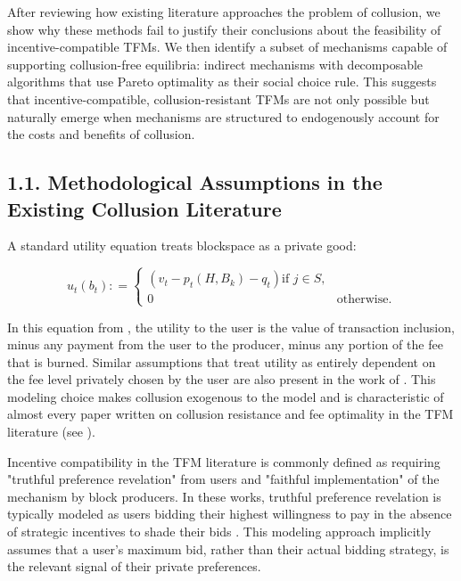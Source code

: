 \documentclass[oneside]{article}   	%
\begin{document}
After reviewing how existing literature approaches the problem of collusion, we show why these methods fail to justify their conclusions about the feasibility of incentive-compatible TFMs. We then identify a subset of mechanisms capable of supporting collusion-free equilibria: indirect mechanisms with decomposable algorithms that use Pareto optimality as their social choice rule. This suggests that incentive-compatible, collusion-resistant TFMs are not only possible but naturally emerge when mechanisms are structured to endogenously account for the costs and benefits of collusion.

\subsection*{1.1. Methodological Assumptions in the Existing Collusion Literature}

A standard utility equation treats blockspace as a private good:

\[
u_t\left(b_t\right) : =
\begin{cases}
\left(
        v_t - p_t\left(H,B_k\right) - q_t
\right) \text{if } j \in S, \\ 0 & \text{otherwise.}
\end{cases}
\]

In this equation from \cite{roughgarden2024}, the utility to the user is the value of transaction inclusion, minus any payment from the user to the producer, minus any portion of the fee that is burned. Similar assumptions that treat utility as entirely dependent on the fee level privately chosen by the user are also present in the work of \cite{chung2023foundations}. This modeling choice makes collusion exogenous to the model and is characteristic of almost every paper written on collusion resistance and fee optimality in the TFM literature (see \cite{chen2022bayesian, ferreira2021dynamic, wu2023maximizing, damle2024designing, gafni2024barriers, bahrani2023transaction, bahrani2024transaction, chung2024collusion}).

Incentive compatibility in the TFM literature is commonly defined as requiring "truthful preference revelation" from users and "faithful implementation" of the mechanism by block producers. In these works, truthful preference revelation is typically modeled as users bidding their highest willingness to pay in the absence of strategic incentives to shade their bids \cite{roughgarden2024, chung2023foundations}. This modeling approach implicitly assumes that a user’s maximum bid, rather than their actual bidding strategy, is the relevant signal of their private preferences.
\end{document}
